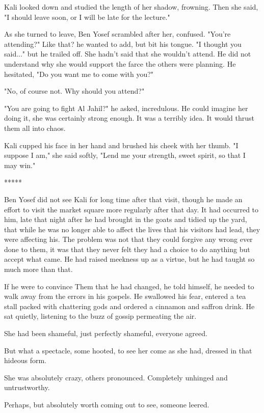 \documentclass{amsart}
\begin{document}
Kali looked down and studied the length of her shadow, frowning. Then she said, "I should leave soon, or I will be late for the lecture." 

As she turned to leave, Ben Yosef scrambled after her, confused. "You're attending?" Like that? he wanted to add, but bit his tongue. "I thought you said..." but he trailed off. She hadn't said that she wouldn't attend. He did not understand why she would support the farce the others were planning. He hesitated, "Do you want me to come with you?" 

"No, of course not. Why should you attend?"

"You are going to fight Al Jahil?" he asked, incredulous. He could imagine her doing it, she was certainly strong enough. It was a terribly idea. It would thrust them all into chaos.

Kali cupped his face in her hand and brushed his cheek with her thumb. "I suppose I am," she said softly, "Lend me your strength, sweet spirit, so that I may win." 

\begin{center}*****\end{center}

Ben Yosef did not see Kali for long time after that visit, though he made an effort to visit the market square more regularly after that day. It had occurred to him, late that night after he had brought in the goats and tidied up the yard, that while he was no longer able to affect the lives that his visitors had lead, they were affecting his. The problem was not that they could forgive any wrong ever done to them, it was that they never felt they had a choice to do anything but accept what came. He had raised meekness up as a virtue, but he had taught so much more than that. 

If he were to convince Them that he had changed, he told himself, he needed to walk away from the errors in his gospels. He swallowed his fear, entered a tea stall packed with chattering gods and ordered a cinnamon and saffron drink. He sat quietly, listening to the buzz of gossip permeating the air.
 
She had been shameful, just perfectly shameful, everyone agreed. 

But what a spectacle, some hooted, to see her come as she had, dressed in that hideous form. 

She was absolutely crazy, others pronounced. Completely unhinged and untrustworthy. 

Perhaps, but absolutely worth coming out to see, someone leered. 
\end{document}

